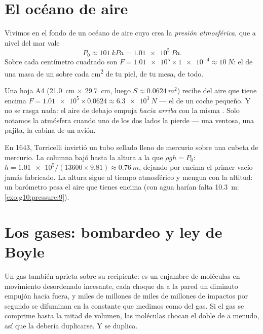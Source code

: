 \section{El océano de aire}

\begin{definition}\label{def:g10:pressure:atmospheric}
Vivimos en el fondo de un océano de aire cuyo  crea la
\emph{presión atmosférica}, que a nivel del
mar vale
\[
P_0 \approx \qty{101}{kPa} = \qty{1.01e5}{Pa}.
\]
Sobre cada centímetro cuadrado son
$F = \num{1.01e5} \times \num{1e-4} \approx \qty{10}{N}$: el  de una
masa de un  sobre cada \unit{cm^2} de tu piel, de tu mesa, de
todo.
\end{definition}

\begin{example}\label{ex:g10:pressure:sheet}
Una hoja A4 (\qty{21.0}{cm} $\times$ \qty{29.7}{cm}, luego
$S \approx \qty{0.0624}{m^2}$) recibe del aire que tiene encima
$F = \num{1.01e5} \times 0.0624 \approx \qty{6.3e3}{N}$ --- el  de
un coche pequeño. Y no se rasga nada: el aire de debajo empuja
\emph{hacia arriba} con la misma . Solo notamos la atmósfera
cuando uno de los dos lados la pierde --- una ventosa, una pajita, la
cabina de un avión.
\end{example}

\begin{remark}\label{rem:g10:pressure:torricelli}
En 1643, Torricelli invirtió un tubo sellado lleno de mercurio sobre una
cubeta de mercurio. La columna bajó hasta la altura a la que
$\rho g h = P_0$:
$h = \num{1.01e5}/(13600 \times 9.81) \approx \qty{0.76}{m}$, dejando
por encima el primer vacío jamás fabricado. La altura sigue al tiempo
atmosférico y mengua con la altitud: un barómetro pesa el aire que
tienes encima (con agua harían falta \qty{10.3}{m}:
\cref{exo:g10:pressure:9}).
\end{remark}

\section{Los gases: bombardeo y ley de Boyle}

Un gas también aprieta sobre su recipiente: es un enjambre de moléculas
en movimiento desordenado incesante, cada choque da a la pared un
diminuto empujón hacia fuera, y miles de millones de miles de millones
de impactos por segundo se difuminan en la  constante que medimos
como  del gas. Si el gas se comprime hasta la mitad de volumen,
las moléculas chocan el doble de a menudo, así que la  debería
duplicarse. Y se duplica.

